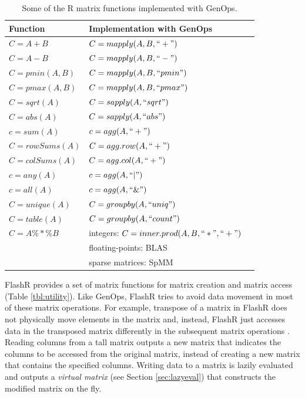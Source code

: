 \begin{table}
\begin{center}
\caption{Some of the R matrix functions implemented with GenOps.}
\vspace{-10pt}
\footnotesize
\begin{tabular}{|l|l|l|}
\hline
Function & Implementation with GenOps \\
\hline
$C=A+B$ & $C=mapply(A, B, ``+")$ \\
$C=A-B$ & $C=mapply(A, B, ``-")$ \\
$C=pmin(A,B)$ & $C=mapply(A, B, ``pmin")$ \\
$C=pmax(A,B)$ & $C=mapply(A, B, ``pmax")$ \\
$C=sqrt(A)$ & $C=sapply(A, ``sqrt")$ \\
$C=abs(A)$ & $C=sapply(A, ``abs")$ \\
\hline
$c=sum(A)$ & $c=agg(A, ``+")$ \\
$C=rowSums(A)$ & $C=agg.row(A, ``+")$ \\
$C=colSums(A)$ & $C=agg.col(A, ``+")$ \\
$c=any(A)$ & $c=agg(A, ``|")$ \\
$c=all(A)$ & $c=agg(A, ``\&")$ \\
\hline
$C=unique(A)$ & $C=groupby(A, ``uniq")$ \\
$C=table(A)$ & $C=groupby(A, ``count")$ \\
\hline
$C=A \%*\% B$ & integers: $C=inner.prod(A, B, ``*", ``+")$ \\
 & floating-points: BLAS \\
 & sparse matrices: SpMM \cite{SEM_SpMM} \\
\hline
\end{tabular}
\normalsize
\label{tbl:Rfuns}
\end{center}
\end{table}

FlashR provides a set of matrix functions for matrix creation and matrix access
(Table \ref{tbl:utility}). Like GenOps, FlashR tries to avoid data movement in
most of these matrix operations. For example, transpose of a matrix in
FlashR does not physically move elements in the matrix and, instead, FlashR
just accesses data in the transposed matrix differently in the subsequent
matrix operations \cite{Guibas78}. Reading columns from a tall matrix outputs
a new matrix
that indicates the columns to be accessed from the original matrix, instead
of creating a new matrix that contains the specified columns. Writing data to
a matrix is lazily evaluated and outputs a \textit{virtual matrix} (see Section
\ref{sec:lazyeval}) that constructs the modified matrix on the fly.

